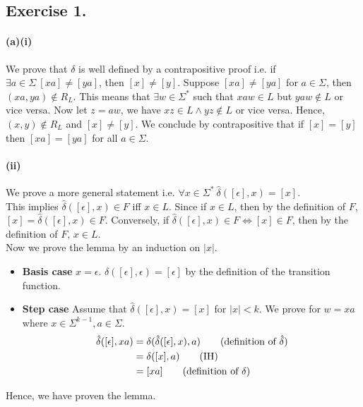 \documentclass[12pt]{article}
\begin{document}
\subsection*{Exercise 1.}
\paragraph*{(a)(i)} We prove that \(\delta\) is well defined by a contrapositive proof i.e. if \(\exists a \in \Sigma \ [xa] \neq [ya]\), then \([x] \neq [y]\).
Suppose \([xa] \neq [ya]\) for \(a \in \Sigma\), then \((xa, ya) \notin R_{L}\). This means that \(\exists w \in \Sigma^{*}\) such that \(xaw \in L\) but \(yaw \notin L\) or vice versa. Now let \(z = aw\), we have \(xz \in L \land yz \notin L\) or vice versa. Hence, \((x, y) \notin R_{L}\) and \([x] \neq [y]\). We conclude by contrapositive that if \([x] = [y]\) then \([xa] = [ya]\) for all \(a \in \Sigma\).
\paragraph*{(ii)} We prove a more general statement i.e. \(\forall x \in \Sigma^{*}\ \hat{\delta}([\epsilon], x) = [x]\).\\
This implies \(\hat{\delta}([\epsilon], x) \in F\) iff \(x \in L\). Since if \(x \in L\), then by the definition of \(F\), \([x] = \hat{\delta}([\epsilon], x) \in F\). Conversely, if \(\hat{\delta}([\epsilon], x) \in F \Leftrightarrow [x] \in F\), then by the definition of \(F\), \(x \in L\). \\
Now we prove the lemma by an induction on \(|x|\).
\begin{itemize}
  \item \textbf{Basis case} \(x = \epsilon\). \(\delta([\epsilon], \epsilon) = [\epsilon]\) by the definition of the transition function.
  \item \textbf{Step case} Assume that \(\hat{\delta}([\epsilon], x) = [x]\) for \(|x| < k\). We prove for \(w = xa\) where \(x \in \Sigma^{k-1}, a \in \Sigma\).
  \begin{align*}
    \hat{\delta}([\epsilon], xa) &= \delta(\hat{\delta}([\epsilon], x), a) \tag*{(definition of \(\hat{\delta}\))} \\
    &= \delta([x], a) \tag*{(IH)} \\
    &= [xa] \tag*{(definition of \(\delta\))}
  \end{align*}
\end{itemize}
Hence, we have proven the lemma.
\end{document}
